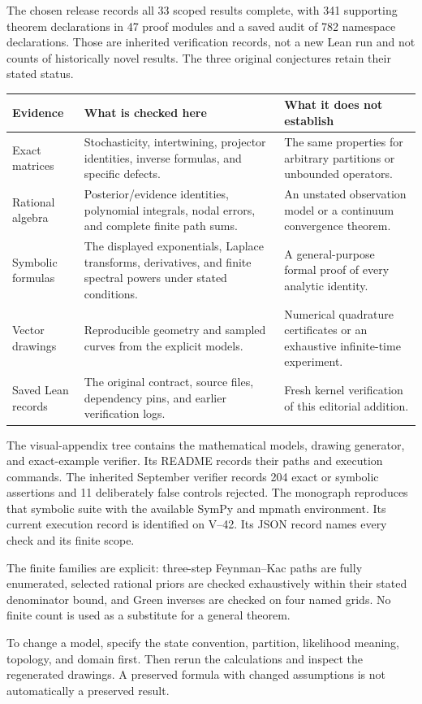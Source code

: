 The chosen release records all 33 scoped results complete, with 341 supporting theorem declarations in 47 proof modules and a saved audit of 782 namespace declarations. Those are inherited verification records, not a new Lean run and not counts of historically novel results. The three original conjectures retain their stated status.
\begin{tabularx}{\linewidth}{@{}>{\raggedright\arraybackslash}p{1.22in}YY@{}}
\toprule
Evidence & What is checked here & What it does not establish\\
\midrule
Exact matrices & Stochasticity, intertwining, projector identities, inverse formulas, and specific defects. & The same properties for arbitrary partitions or unbounded operators.\\
Rational algebra & Posterior/evidence identities, polynomial integrals, nodal errors, and complete finite path sums. & An unstated observation model or a continuum convergence theorem.\\
Symbolic formulas & The displayed exponentials, Laplace transforms, derivatives, and finite spectral powers under stated conditions. & A general-purpose formal proof of every analytic identity.\\
Vector drawings & Reproducible geometry and sampled curves from the explicit models. & Numerical quadrature certificates or an exhaustive infinite-time experiment.\\
Saved Lean records & The original contract, source files, dependency pins, and earlier verification logs. & Fresh kernel verification of this editorial addition.\\
\bottomrule
\end{tabularx}
The visual-appendix tree contains the mathematical models, drawing generator, and exact-example verifier. Its README records their paths and execution commands. The inherited September verifier records 204 exact or symbolic assertions and 11 deliberately false controls rejected. The monograph reproduces that symbolic suite with the available SymPy and mpmath environment. Its current execution record is identified on V--42. Its JSON record names every check and its finite scope.

The finite families are explicit: three-step Feynman--Kac paths are fully enumerated, selected rational priors are checked exhaustively within their stated denominator bound, and Green inverses are checked on four named grids. No finite count is used as a substitute for a general theorem.

To change a model, specify the state convention, partition, likelihood meaning, topology, and domain first. Then rerun the calculations and inspect the regenerated drawings. A preserved formula with changed assumptions is not automatically a preserved result.
